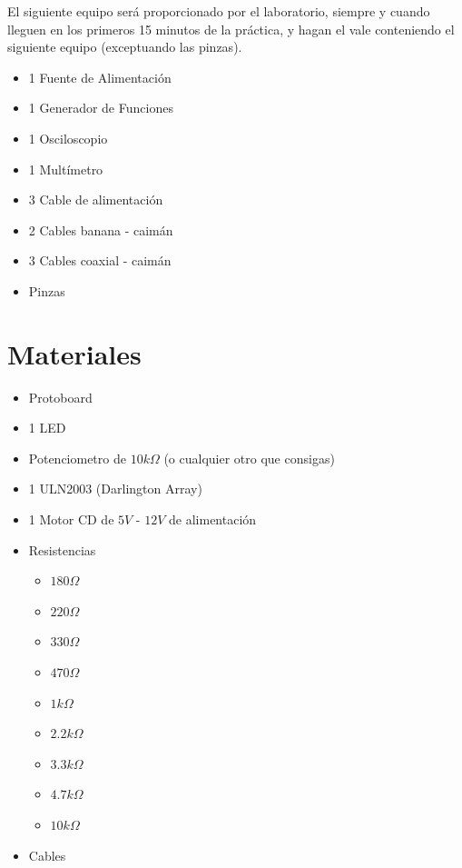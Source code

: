 	El siguiente equipo será proporcionado por el laboratorio, siempre y cuando lleguen en los primeros 15 minutos de la práctica, y hagan el vale conteniendo el siguiente equipo (exceptuando las pinzas).

	\begin{itemize}
		\item 1 Fuente de Alimentación
		\item 1 Generador de Funciones
		\item 1 Osciloscopio
		\item 1 Multímetro
		\item 3 Cable de alimentación
		\item 2 Cables banana - caimán
		\item 3 Cables coaxial - caimán
		\item Pinzas
	\end{itemize}


\section{Materiales}

	\begin{itemize}
		\item Protoboard
		\item 1 LED
		\item Potenciometro de $10 k \Omega$ (o cualquier otro que consigas)
		\item 1 ULN2003 (Darlington Array)
		\item 1 Motor CD de $5 V$ - $12 V$ de alimentación
		\item Resistencias
		\begin{itemize}
			\item $180 \Omega$
			\item $220 \Omega$
			\item $330 \Omega$
			\item $470 \Omega$
			\item $1 k\Omega$
			\item $2.2 k\Omega$
			\item $3.3 k\Omega$
			\item $4.7 k\Omega$
			\item $10 k\Omega$
		\end{itemize}
		\item Cables
	\end{itemize}

